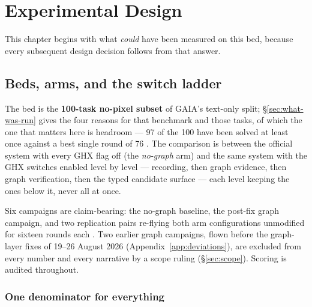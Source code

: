 \chapter{Experimental Design}
\label{ch:design}


This chapter begins with what \emph{could} have been measured on this bed,
because every subsequent design decision follows from that answer.

\section{Beds, arms, and the switch ladder}
\label{sec:beds}

The bed is the \textbf{100-task no-pixel subset} of GAIA's text-only
split; \S\ref{sec:what-was-run} gives the four reasons for that benchmark
and those tasks, of which the one that matters here is headroom --- 97 of
the 100 have been solved at least once against a best single round of 76
. The comparison is
between the official system with every GHX flag off (the \emph{no-graph}
arm) and the same system with the GHX switches enabled level by level ---
recording, then graph evidence, then graph verification, then the typed
candidate surface --- each level keeping the ones below it, never all at
once.

Six campaigns are claim-bearing: the no-graph baseline, the post-fix graph
campaign, and two replication pairs re-flying both arm configurations
unmodified for sixteen rounds each . Two earlier graph
campaigns, flown before the graph-layer fixes of 19--26 August 2026
(Appendix~\ref{app:deviations}), are excluded from every number and every
narrative by a scope ruling (\S\ref{sec:scope}).
Scoring is audited throughout.

\subsection*{One denominator for everything}

